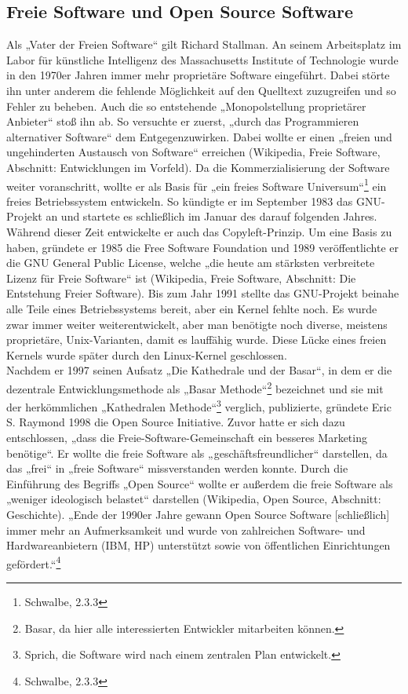 \documentclass[a4paper,12pt]{article}
\begin{document}
\subsection{Freie Software und Open Source Software}
Als „Vater der Freien Software“ gilt Richard Stallman. An seinem Arbeitsplatz im Labor für künstliche Intelligenz des Massachusetts Institute of Technologie wurde in den 1970er Jahren immer mehr proprietäre Software eingeführt. Dabei störte ihn unter anderem die fehlende Möglichkeit auf den Quelltext zuzugreifen und so Fehler zu beheben. Auch die so entstehende „Monopolstellung proprietärer Anbieter“ stoß ihn ab. So versuchte er zuerst, „durch das Programmieren alternativer Software“ dem Entgegenzuwirken. Dabei wollte er einen „freien und ungehinderten Austausch von Software“ erreichen (Wikipedia, Freie Software, Abschnitt: Entwicklungen im Vorfeld). Da die Kommerzialisierung der Software weiter voranschritt, wollte er als Basis für „ein freies Software Universum“\footnote{Schwalbe, 2.3.3} ein freies Betriebssystem entwickeln. So kündigte er im September 1983 das GNU-Projekt an und startete es schließlich im Januar des darauf folgenden Jahres. Während dieser Zeit entwickelte er auch das Copyleft-Prinzip. Um eine Basis zu haben, gründete er 1985 die Free Software Foundation und 1989 veröffentlichte er die GNU General Public License, welche „die heute am stärksten verbreitete Lizenz für Freie Software“ ist (Wikipedia, Freie Software, Abschnitt: Die Entstehung Freier Software). Bis zum Jahr 1991 stellte das GNU-Projekt beinahe alle Teile eines Betriebssystems bereit, aber ein Kernel fehlte noch. Es wurde zwar immer weiter weiterentwickelt, aber man benötigte noch diverse, meistens proprietäre, Unix-Varianten, damit es lauffähig wurde. Diese Lücke eines freien Kernels wurde später durch den Linux-Kernel geschlossen.\\
Nachdem er 1997 seinen Aufsatz „Die Kathedrale und der Basar“, in dem er die dezentrale Entwicklungsmethode als „Basar Methode“\footnote{Basar, da hier alle interessierten Entwickler mitarbeiten können.} bezeichnet und sie mit der herkömmlichen „Kathedralen Methode“\footnote{Sprich, die Software wird nach einem zentralen Plan entwickelt.} verglich, publizierte, gründete Eric S. Raymond 1998 die Open Source Initiative. Zuvor hatte er sich dazu entschlossen, „dass die Freie-Software-Gemeinschaft ein besseres Marketing benötige“. Er wollte die freie Software als „geschäftsfreundlicher“ darstellen, da das „frei“ in „freie Software“ missverstanden werden konnte. Durch die Einführung des Begriffs „Open Source“ wollte er außerdem die freie Software als „weniger ideologisch belastet“ darstellen (Wikipedia, Open Source, Abschnitt: Geschichte). „Ende der 1990er Jahre gewann Open Source Software [schließlich] immer mehr an Aufmerksamkeit und wurde von zahlreichen Software- und Hardwareanbietern (IBM, HP) unterstützt sowie von öffentlichen Einrichtungen gefördert.“\footnote{Schwalbe, 2.3.3}
\end{document}
